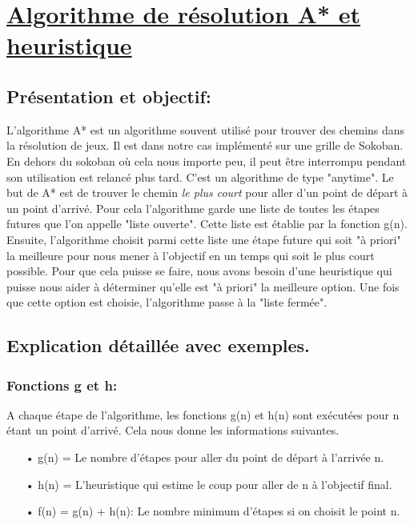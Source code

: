 \documentclass{article}
\begin{document}
\newpage

\section{\underline{ Algorithme de résolution A* et heuristique}}
	
\vspace{1.5 cm}


\subsection{Présentation et objectif:}
L'algorithme A* est un algorithme souvent utilisé pour trouver des chemins dans la résolution de jeux. Il est dans notre cas implémenté sur une grille de Sokoban. En dehors du sokoban où cela nous importe peu, il peut être interrompu pendant son utilisation est relancé plus tard. C'est un algorithme de type "anytime".
Le but de A* est de trouver le chemin \textit{le plus court} pour aller d'un point de départ à un point d'arrivé. Pour cela l'algorithme garde une liste de toutes les étapes futures que l'on appelle "liste ouverte". Cette liste est établie par la fonction g(n). Ensuite, l'algorithme choisit parmi cette liste une étape future qui soit "à priori" la meilleure pour nous mener à l'objectif en un temps qui soit le plus court possible. Pour que cela puisse se faire, nous avons besoin d'une heuristique qui puisse nous aider à déterminer qu'elle est "à priori" la meilleure option. Une fois que cette option est choisie, l'algorithme passe à la "liste fermée". 
\subsection{Explication détaillée avec exemples.}
\subsubsection{Fonctions g et h:}
A chaque étape de l'algorithme, les fonctions g(n) et h(n) sont exécutées pour n étant un point d'arrivé. Cela nous donne les informations suivantes.
\begin{itemize}
\item[• g(n) = Le nombre d'étapes pour aller du point de départ à l'arrivée n.]
\item[• h(n) = L'heuristique qui estime le coup pour aller de n à l'objectif final.]
\item[• f(n) = g(n) + h(n): Le nombre minimum d'étapes si on choisit le point n.]
\end{itemize}
\end{document}
